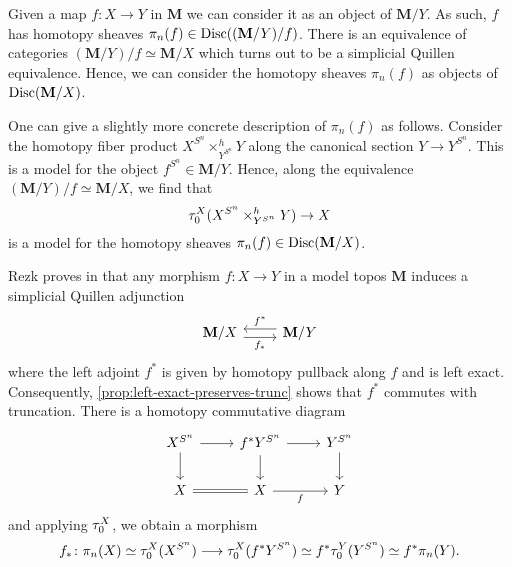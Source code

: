 Given a map \(f\colon X\to Y\) in \(\mathbf M\) we can consider it as an object of \(\mathbf M/Y\). As such, \(f\) has homotopy sheaves \(\pi_{n}(f)\in\operatorname{\textnormal{Disc}}((\mathbf M/Y)/f)\). There is an equivalence of categories \((\mathbf M/Y)/f\simeq \mathbf M/X\) which turns out to be a simplicial Quillen equivalence. Hence, we can consider the homotopy sheaves \(\pi_{n}(f)\) as objects of \(\operatorname{\textnormal{Disc}}(\mathbf M/X)\).

One can give a slightly more concrete description of \(\pi_{n}(f)\) as follows. Consider the homotopy fiber product \(X^{S^{n}}\times^{h}_{Y^{S^{n}}} Y\) along the canonical section \(Y\to Y^{S^{n}}\). This is a model for the object \(f^{S^{n}}\in \mathbf M/Y\). Hence, along the equivalence \((\mathbf M/Y)/f\simeq \mathbf M/X\), we find that
\[\tau_{0}^{X}(X^{S^{n}}\times^{h}_{Y^{S^{n}}} Y)\to X\]
is a model for the homotopy sheaves \(\pi_{n}(f)\in\operatorname{\textnormal{Disc}}(\mathbf M/X)\).

\begin{remark}\label{rem:homotopy-group-functoriality}
  Rezk proves in \cite[Example~6.13]{rezkhomotopytoposes} that any morphism \(f\colon X\to Y\) in a model topos \(\mathbf M\) induces a simplicial Quillen adjunction
  \[
  \begin{tikzcd}
    \mathbf M/X \arrow[r, shift right=.7ex, "f_{*}"'] & \arrow[l, shift right=.7ex, "f^{*}"'] \mathbf M/Y
  \end{tikzcd}
  \]
  where the left adjoint \(f^{*}\) is given by homotopy pullback along \(f\) and is left exact. Consequently, \autoref{prop:left-exact-preserves-trunc} shows that \(f^{*}\) commutes with truncation. There is a homotopy commutative diagram
  \[
  \begin{tikzcd}
    X^{S^{n}} \arrow[r] \arrow[d] & f^{*}Y^{S^{n}} \arrow[r] \arrow[d] & Y^{S^{n}} \arrow[d] \\
    X \arrow[r, equals] & X \arrow[r, "f"'] & Y
  \end{tikzcd}
  \]
  and applying \(\tau_{0}^{X}\), we obtain a morphism
  \[f_{*}\colon \pi_{n}(X)\simeq\tau_{0}^{X}(X^{S^{n}})\longrightarrow \tau_{0}^{X}(f^{*}Y^{S^{n}})\simeq f^{*}\tau_{0}^{Y}(Y^{S^{n}})\simeq f^{*}\pi_{n}(Y).\]
\end{remark}

